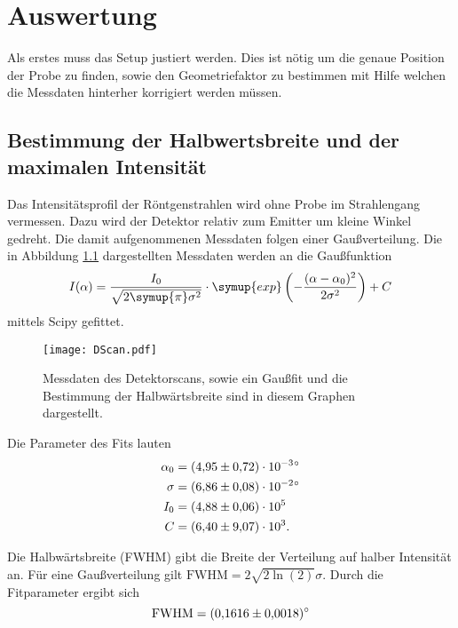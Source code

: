 \chapter{Auswertung}
\label{cha:Auswertung}
Als erstes muss das Setup justiert werden. Dies ist nötig um die genaue Position der Probe zu finden, sowie den Geometriefaktor zu bestimmen mit Hilfe welchen die Messdaten 
hinterher korrigiert werden müssen.

\section{Bestimmung der Halbwertsbreite und der maximalen Intensität}
\label{sec:FWHM}
Das Intensitätsprofil der Röntgenstrahlen wird ohne Probe im Strahlengang vermessen. Dazu wird der Detektor relativ zum Emitter um kleine Winkel gedreht. Die damit aufgenommenen 
Messdaten folgen einer Gaußverteilung. Die in Abbildung \ref{fig:DScan} dargestellten Messdaten werden an die Gaußfunktion 
\begin{equation*}
    I(\alpha) = \frac{I_0}{\sqrt{2\symup{\pi}\sigma^2}}\cdot \symup{exp}\left(-\frac{(\alpha - \alpha_0)^2}{2\sigma^2}\right) + C
\end{equation*}
mittels Scipy \cite{scipy} gefittet.

\begin{figure}
    \centering
    \texttt{[image: DScan.pdf]}
    \caption{Messdaten des Detektorscans, sowie ein Gaußfit und die Bestimmung der Halbwärtsbreite sind in diesem Graphen dargestellt.}
    \label{fig:DScan}
  \end{figure}

Die Parameter des Fits lauten
\begin{align*}
    \alpha_0 &= \qty{4.95 +-0.72e-3}{\degree} \\
    \sigma &= \qty{6.86 +- 0.08e-2}{\degree} \\
    I_0 &= \num{4.88 +- 0.06e5} \\
    C &= \num{6.40 +- 9.07e3}.
\end{align*}

Die Halbwärtsbreite (FWHM) gibt die Breite der Verteilung auf halber Intensität an. Für eine Gaußverteilung gilt $\text{FWHM} = 2\sqrt{2\ln\left(2\right)}\sigma$. Durch die 
Fitparameter ergibt sich 
\begin{equation*}
    \text{FWHM} = \qty{0.1616+-0.0018}{\degree}
\end{equation*}

